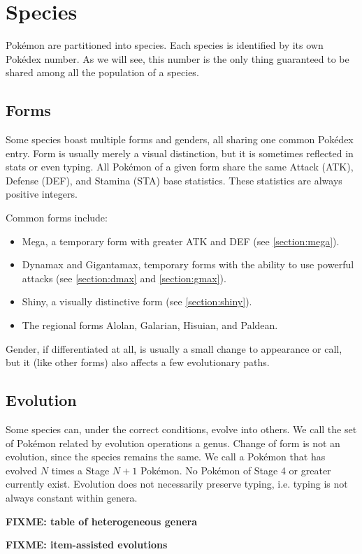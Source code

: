 \chapter{Species}
Pokémon are partitioned into species.
Each species is identified by its own Pokédex number.
As we will see, this number is the only thing guaranteed to be shared
 among all the population of a species.

\section{Forms}
Some species boast multiple forms and genders, all sharing one common Pokédex entry.
Form is usually merely a visual distinction, but it is sometimes reflected
 in stats or even typing.
All Pokémon of a given form share the same Attack (ATK), Defense (DEF), and
 Stamina (STA) base statistics.
These statistics are always positive integers.

Common forms include:
\begin{itemize}
  \item Mega, a temporary form with greater ATK and DEF (see \autoref{section:mega}).
  \item Dynamax and Gigantamax, temporary forms with the ability to use
          powerful attacks (see \autoref{section:dmax} and \autoref{section:gmax}).
  \item Shiny, a visually distinctive form (see \autoref{section:shiny}).
  \item The regional forms Alolan, Galarian, Hisuian, and Paldean.
\end{itemize}
Gender, if differentiated at all, is usually a small change to
 appearance or call, but it (like other forms) also affects a few evolutionary
 paths.

\section{Evolution}
Some species can, under the correct conditions, evolve into others.
We call the set of Pokémon related by evolution operations a genus.
Change of form is not an evolution, since the species remains the same.
We call a Pokémon that has evolved $N$ times a Stage $N+1$ Pokémon.
No Pokémon of Stage 4 or greater currently exist.
Evolution does not necessarily preserve typing, i.e. typing is not always constant within genera.

\textbf{FIXME: table of heterogeneous genera}

\textbf{FIXME: item-assisted evolutions}

